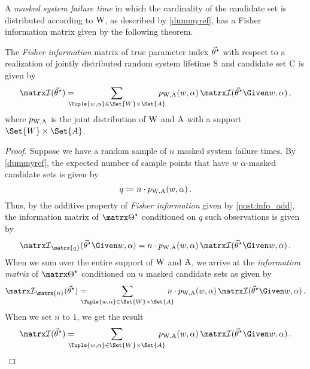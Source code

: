 \documentclass[../main.tex]{subfiles}
\begin{document}
A \emph{masked system failure time} in which the cardinality of the candidate set is distributed according to $\mathrm{W}$, as described by \cref{dummyref}, has 
a Fisher information matrix given by the following theorem.
\begin{theorem}
	The \emph{Fisher information} matrix of true parameter index ${\vec{\theta}}^{\star}$ with respect to a realization of jointly distributed random system lifetime $\mathrm{S}$ and candidate set $\mathrm{C}$ is given by
	\begin{equation}
	\infomatrx(\tparam\sysparamvec) = \kern-1em
	\sum_{\Tuple{w,\alpha} \in \Set{W} \times \Set{A}} \kern-1em \pmf_{\RV{W},\RV{A}}(w,\alpha) \infomatrx(\tparam\sysparamvec \Given w, \alpha)\,,
	\end{equation}
	where $p_{\mathrm{W}, \mathrm{A}}$ is the joint distribution of $\mathrm{W}$ and $\mathrm{A}$ with a support $\Set{W} \times \Set{A}$.
\end{theorem}
\begin{proof}
	Suppose we have a random sample of $n$ masked system failure times.
	By \cref{dummyref}, the expected number of sample points that have $w$ $\alpha$-masked candidate sets is given by
	\begin{equation}
	q \coloneqq n \cdot p_{\mathrm{W},\mathrm{A}}(w,\alpha)\,.
	\end{equation}
	Thus, by the additive property of \emph{Fisher information} given by \cref{post:info_add}, the information matrix of $\tparam\sysparam$ conditioned on $q$ such observations is given by
	\begin{equation}
	\infomatrx_{\matrx{q}}(\tparam\sysparamvec \Given w, \alpha) = n \cdot \pmf_{\RV{W},\RV{A}}(w,\alpha) \infomatrx(\tparam\sysparamvec \Given w, \alpha)\,.
	\end{equation}
	When we sum over the entire support of $\mathrm{W}$ and $\mathrm{A}$, we arrive at the \emph{information matrix} of $\tparam\sysparam$ conditioned on $n$ masked candidate sets as given by
	\begin{equation}
	\infomatrx_{\matrx{n}}(\tparam\sysparamvec) = \kern-1em
	\sum_{\Tuple{w,\alpha} \in \Set{W} \times \Set{A}} \kern-1em n \cdot \pmf_{\RV{W},\RV{A}}(w,\alpha) \infomatrx(\tparam\sysparamvec \Given w, \alpha)\,.
	\end{equation}
	When we set $n$ to $1$, we get the result
	\begin{equation}
	\infomatrx(\tparam\sysparamvec) = \kern-1em
	\sum_{\Tuple{w,\alpha} \in \Set{W} \times \Set{A}} \kern-1em \pmf_{\RV{W},\RV{A}}(w,\alpha) \infomatrx(\tparam\sysparamvec \Given w, \alpha)\,.
	\end{equation}
\end{proof}
\end{document}
